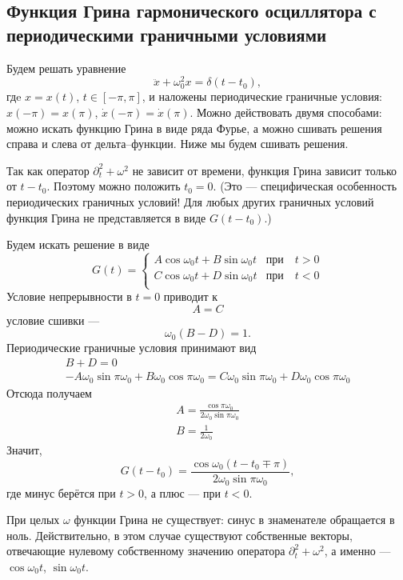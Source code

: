 \documentclass{article}
\begin{document}
\subsection{Функция Грина гармонического осциллятора с периодическими граничными условиями}
Будем решать уравнение
\begin{equation}
    \ddot{x} + \omega_0^2 x = \delta(t - t_0),
\end{equation}
гдe $x = x(t)$, $t\in [-\pi, \pi]$, и наложены периодические граничные условия:
$x(-\pi) = x(\pi)$, $\dot{x}(-\pi) = \dot{x}(\pi)$. 
Можно действовать двумя способами:
можно искать функцию Грина в виде ряда Фурье, а можно сшивать решения справа и слева от
дельта--функции. Ниже мы будем сшивать решения.

Так как оператор $\partial_t^2 + \omega^2$ не зависит от времени, 
функция Грина зависит только от $t - t_0$. Поэтому можно положить $t_0 = 0$. (Это ---
специфическая особенность периодических граничных условий! Для любых других граничных условий
функция Грина не представляется в виде $G(t - t_0)$.)

Будем искать решение в виде
\begin{equation}
    G(t) = \left\{\begin{matrix}
                A\cos{\omega_0 t} + B\sin{\omega_0 t} & \text{при} \quad t > 0\\
                C\cos{\omega_0 t} + D\sin{\omega_0 t} & \text{при} \quad t < 0\\
           \end{matrix}\right.
\end{equation}
Условие непрерывности в $t = 0$ приводит к 
\begin{equation}
    A = C
\end{equation}
условие сшивки ---
\begin{equation}
    \omega_0(B - D) = 1.
\end{equation}
Периодические граничные условия принимают вид 
\begin{equation}
    \begin{gathered}
        B + D = 0\\
        -A\omega_0 \sin{\pi\omega_0} + B\omega_0 \cos{\pi \omega_0} = 
            C \omega_0 \sin{\pi \omega_0} + D\omega_0 \cos{\pi \omega_0}
    \end{gathered}
\end{equation}
Отсюда получаем
\begin{equation}
    \begin{gathered}
        A = \frac{\cos{\pi\omega_0}}{2\omega_0 \sin{\pi \omega_0}}\\
        B = \frac{1}{2\omega_0}
    \end{gathered}
\end{equation}
Значит,
\begin{equation}
    G(t - t_0) = \frac{\cos{\omega_0 (t - t_0 \mp \pi)}}
                {2\omega_0 \sin{\pi \omega_0}},
\end{equation}
где минус берётся при $t > 0$, а плюс ---  при $t < 0$.

При целых $\omega$ функции Грина не существует: синус в знаменателе обращается в ноль.
Действительно, в этом случае существуют собственные векторы,
отвечающие нулевому собственному значению 
оператора $\partial_t^2 + \omega^2$, а именно ---  $\cos{\omega_0 t}$, $\sin{\omega_0 t}$.
\end{document}
